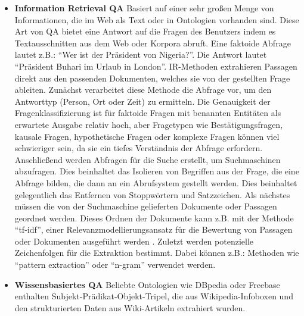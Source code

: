 \documentclass[
        ngerman,
        paper=a4,
        numbers=noendperiod,
]{scrreprt}
\begin{document}
\begin{itemize}
    \item \textbf{Information Retrieval QA} Basiert auf einer sehr großen Menge von Informationen, die im Web als Text oder in Ontologien vorhanden sind. Diese Art von QA bietet eine Antwort auf die Fragen des Benutzers indem es Textausschnitten aus dem Web oder Korpora abruft. Eine faktoide Abfrage lautet z.B.: \enquote{Wer ist der Präsident von Nigeria?}. Die Antwort lautet \enquote{Präsident Buhari im Urlaub in London}. IR-Methoden extrahieren Passagen direkt aus den passenden Dokumenten, welches sie von der gestellten Frage ableiten. Zunächst verarbeitet diese Methode die Abfrage vor, um den Antworttyp (Person, Ort oder Zeit) zu ermitteln. Die Genauigkeit der Fragenklassifizierung ist für faktoide Fragen mit benannten Entitäten als erwartete Ausgabe relativ hoch, aber Fragetypen wie Bestätigungsfragen, kausale Fragen, hypothetische Fragen oder komplexe Fragen können viel schwieriger sein, da sie ein tiefes Verständnis der Abfrage erfordern. Anschließend werden Abfragen für die Suche erstellt, um Suchmaschinen abzufragen. Dies beinhaltet das Isolieren von Begriffen aus der Frage, die eine Abfrage bilden, die dann an ein Abrufsystem gestellt werden. Dies beinhaltet gelegentlich das Entfernen von Stoppwörtern und Satzzeichen. Als nächstes müssen die von der Suchmaschine gelieferten Dokumente oder Passagen geordnet werden. Dieses Ordnen der Dokumente kann z.B. mit der Methode \enquote{tf-idf}, einer Relevanzmodellierungsansatz für die Bewertung von Passagen oder Dokumenten ausgeführt werden \citep[S. 467 - 470]{Jurafsky2014SpeechProcessing}.
    Zuletzt werden potenzielle Zeichenfolgen für die Extraktion bestimmt. Dabei können z.B.: Methoden wie \enquote{pattern extraction} \citep{soubbotin2001patterns} oder \enquote{n-gram} \citep{brill2001data} verwendet werden.
    \item \textbf{Wissensbasiertes QA} Beliebte Ontologien wie DBpedia \citep{bizer2009dbpedia} oder Freebase \citep{bollacker2008freebase} enthalten Subjekt-Prädikat-Objekt-Tripel, die aus Wikipedia-Infoboxen und den strukturierten Daten aus Wiki-Artikeln extrahiert wurden. 
    

\end{itemize}
\end{document}
